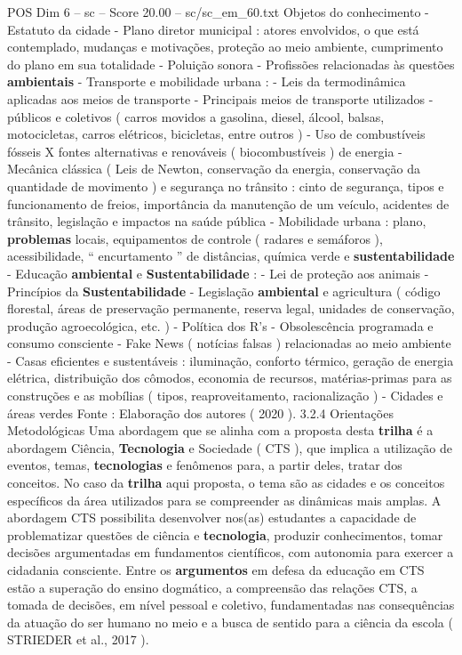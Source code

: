 \begin{textsample}{POS Dim 6 – sc – Score 20.00 – sc/sc\_em\_60.txt}
Objetos do conhecimento - Estatuto da cidade - Plano diretor municipal : atores envolvidos, o que está contemplado, mudanças e motivações, proteção ao meio ambiente, cumprimento do plano em sua totalidade - Poluição sonora - Profissões relacionadas às questões \textbf{ambientais} - Transporte e mobilidade urbana : - Leis da termodinâmica aplicadas aos meios de transporte - Principais meios de transporte utilizados - públicos e coletivos ( carros movidos a gasolina, diesel, álcool, balsas, motocicletas, carros elétricos, bicicletas, entre outros ) - Uso de combustíveis fósseis X fontes alternativas e renováveis ( biocombustíveis ) de energia - Mecânica clássica ( Leis de Newton, conservação da energia, conservação da quantidade de movimento ) e segurança no trânsito : cinto de segurança, tipos e funcionamento de freios, importância da manutenção de um veículo, acidentes de trânsito, legislação e impactos na saúde pública - Mobilidade urbana : plano, \textbf{problemas} locais, equipamentos de controle ( radares e semáforos ), acessibilidade, “ encurtamento ” de distâncias, química verde e \textbf{sustentabilidade} - Educação \textbf{ambiental} e \textbf{Sustentabilidade} : - Lei de proteção aos animais - Princípios da \textbf{Sustentabilidade} - Legislação \textbf{ambiental} e agricultura ( código florestal, áreas de preservação permanente, reserva legal, unidades de conservação, produção agroecológica, etc. ) - Política dos R’s - Obsolescência programada e consumo consciente - Fake News ( notícias falsas ) relacionadas ao meio ambiente - Casas eficientes e sustentáveis : iluminação, conforto térmico, geração de energia elétrica, distribuição dos cômodos, economia de recursos, matérias-primas para as construções e as mobílias ( tipos, reaproveitamento, racionalização ) - Cidades e áreas verdes Fonte : Elaboração dos autores ( 2020 ). 3.2.4 Orientações Metodológicas Uma abordagem que se alinha com a proposta desta \textbf{trilha} é a abordagem Ciência, \textbf{Tecnologia} e Sociedade ( CTS ), que implica a utilização de eventos, temas, \textbf{tecnologias} e fenômenos para, a partir deles, tratar dos conceitos.
No caso da \textbf{trilha} aqui proposta, o tema são as cidades e os conceitos específicos da área utilizados para se compreender as dinâmicas mais amplas.
A abordagem CTS possibilita desenvolver nos(as) estudantes a capacidade de problematizar questões de ciência e \textbf{tecnologia}, produzir conhecimentos, tomar decisões argumentadas em fundamentos científicos, com autonomia para exercer a cidadania consciente.
Entre os \textbf{argumentos} em defesa da educação em CTS estão a superação do ensino dogmático, a compreensão das relações CTS, a tomada de decisões, em nível pessoal e coletivo, fundamentadas nas consequências da atuação do ser humano no meio e a busca de sentido para a ciência da escola ( STRIEDER et al., 2017 ).

\end{textsample}
